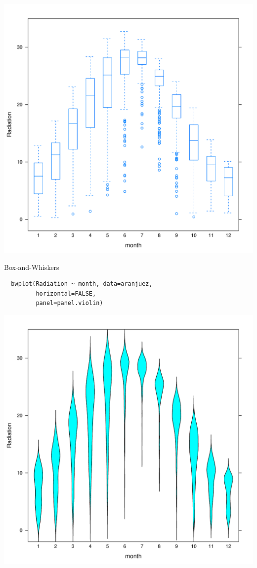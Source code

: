 \documentclass[xcolor={usenames,svgnames,dvipsnames}]{beamer}
\begin{document}
\begin{frame}[label=sec-2-1-41]{}
\includegraphics[width=.9\linewidth]{figs/bwplot.pdf}
\end{frame}

\begin{frame}[fragile,label=sec-2-1-42]{Box-and-Whiskers}
 \lstset{language=R,label= ,caption= ,numbers=none}
\begin{lstlisting}
  bwplot(Radiation ~ month, data=aranjuez,
         horizontal=FALSE,
         panel=panel.violin)
\end{lstlisting}
\end{frame}

\begin{frame}[label=sec-2-1-43]{}
\includegraphics[width=.9\linewidth]{figs/violin.pdf}
\end{frame}
\end{document}
